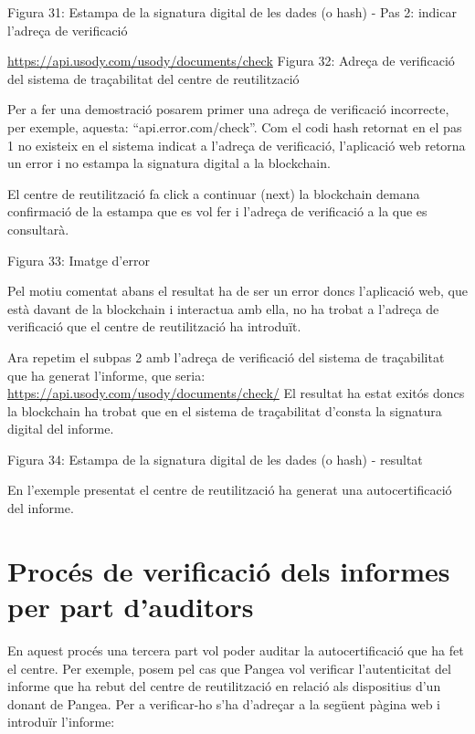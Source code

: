 \documentclass[
]{book}
\begin{document}
Figura 31: Estampa de la signatura digital de les dades (o hash) - Pas 2: indicar l'adreça de verificació

\url{https://api.usody.com/usody/documents/check} Figura 32: Adreça de verificació del sistema de traçabilitat del centre de reutilització

Per a fer una demostració posarem primer una adreça de verificació incorrecte, per exemple, aquesta: ``api.error.com/check''. Com el codi hash retornat en el pas 1 no existeix en el sistema indicat a l'adreça de verificació, l'aplicació web retorna un error i no estampa la signatura digital a la blockchain.

El centre de reutilització fa click a continuar (next) la blockchain demana confirmació de la estampa que es vol fer i l'adreça de verificació a la que es consultarà.

Figura 33: Imatge d'error

Pel motiu comentat abans el resultat ha de ser un error doncs l'aplicació web, que està davant de la blockchain i interactua amb ella, no ha trobat a l'adreça de verificació que el centre de reutilització ha introduït.

Ara repetim el subpas 2 amb l'adreça de verificació del sistema de traçabilitat que ha generat l'informe, que seria: \url{https://api.usody.com/usody/documents/check/} El resultat ha estat exitós doncs la blockchain ha trobat que en el sistema de traçabilitat d'consta la signatura digital del informe.

Figura 34: Estampa de la signatura digital de les dades (o hash) - resultat

En l'exemple presentat el centre de reutilització ha generat una autocertificació del informe.

\hypertarget{procuxe9s-de-verificaciuxf3-dels-informes-per-part-dauditors}{%
\section{Procés de verificació dels informes per part d'auditors}\label{procuxe9s-de-verificaciuxf3-dels-informes-per-part-dauditors}}

En aquest procés una tercera part vol poder auditar la autocertificació que ha fet el centre. Per exemple, posem pel cas que Pangea vol verificar l'autenticitat del informe que ha rebut del centre de reutilització en relació als dispositius d'un donant de Pangea. Per a verificar-ho s'ha d'adreçar a la següent pàgina web i introduïr l'informe:
\end{document}
